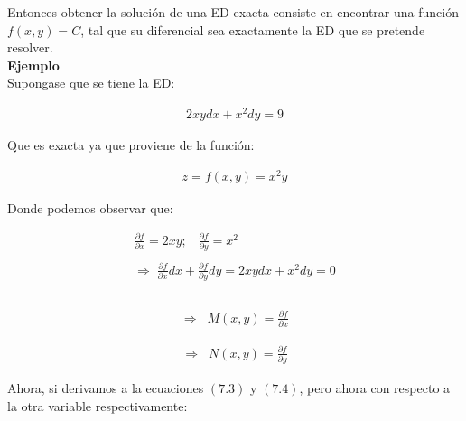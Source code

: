 Entonces obtener la solución de una ED exacta consiste en encontrar una función \(\displaystyle f(x,y)=C\), tal que su diferencial sea exactamente la ED que se pretende resolver.\\

\textbf{Ejemplo}\\

Supongase que se tiene la ED:

\begin{equation*}
    \begin{gathered}
        2xydx+x^{2}dy=9
    \end{gathered}
\end{equation*}

Que es exacta ya que proviene de la función:

\begin{equation*}
    \begin{gathered}
        z=f(x,y)=x^{2}y
    \end{gathered}
\end{equation*}

Donde podemos observar que:

\begin{equation*}
    \begin{gathered}
        \frac{\partial{f}}{\partial{x}}=2xy;\;\;\;\frac{\partial{f}}{\partial{y}}=x^{2}\\\\
        \Rightarrow\;\frac{\partial{f}}{\partial{x}}dx+\frac{\partial{f}}{\partial{y}}dy=2xydx+x^{2}dy=0\\\\
    \end{gathered}
\end{equation*}

\begin{equation}
    \begin{gathered}
        \Rightarrow\;\;M(x,y)=\frac{\partial{f}}{\partial{x}}
    \end{gathered}
\end{equation}

\begin{equation}
    \begin{gathered}
        \Rightarrow\;\;N(x,y)=\frac{\partial{f}}{\partial{y}}
    \end{gathered}
\end{equation}

Ahora, si derivamos a la ecuaciones \(\displaystyle (7.3)\) y \(\displaystyle (7.4)\), pero ahora con respecto a la otra variable respectivamente:

